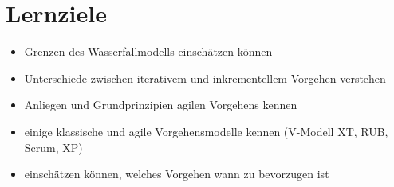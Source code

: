 \section{Lernziele}
\begin{itemize}
    \item Grenzen des Wasserfallmodells einschätzen können
    \item Unterschiede zwischen iterativem und inkrementellem Vorgehen verstehen
    \item Anliegen und Grundprinzipien agilen Vorgehens kennen
    \item einige klassische und agile Vorgehensmodelle kennen (V-Modell XT, RUB, Scrum, XP)
    \item einschätzen können, welches Vorgehen wann zu bevorzugen ist
\end{itemize}